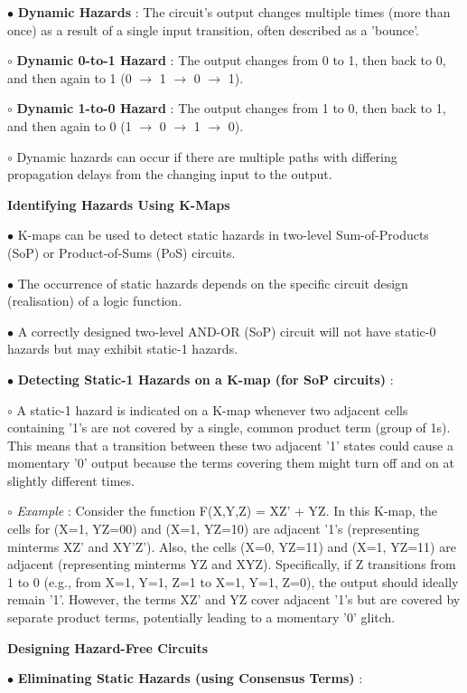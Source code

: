 \documentclass{article}
\begin{document}
\begin{itemize}
$\bullet$ \textbf{Dynamic Hazards} : The circuit's output changes multiple times (more than once) as a result of a single input transition, often described as a 'bounce'.

    $\circ$ \textbf{Dynamic 0-to-1 Hazard} : The output changes from 0 to 1, then back to 0, and then again to 1 (0 $\rightarrow$ 1 $\rightarrow$ 0 $\rightarrow$ 1).

    $\circ$ \textbf{Dynamic 1-to-0 Hazard} : The output changes from 1 to 0, then back to 1, and then again to 0 (1 $\rightarrow$ 0 $\rightarrow$ 1 $\rightarrow$ 0).

    $\circ$ Dynamic hazards can occur if there are multiple paths with differing propagation delays from the changing input to the output.

\textbf{Identifying Hazards Using K-Maps}

$\bullet$ K-maps can be used to detect static hazards in two-level Sum-of-Products (SoP) or Product-of-Sums (PoS) circuits.

$\bullet$ The occurrence of static hazards depends on the specific circuit design (realisation) of a logic function.

$\bullet$ A correctly designed two-level AND-OR (SoP) circuit will not have static-0 hazards but may exhibit static-1 hazards.

$\bullet$ \textbf{Detecting Static-1 Hazards on a K-map (for SoP circuits)} :

    $\circ$ A static-1 hazard is indicated on a K-map whenever two adjacent cells containing '1's are not covered by a single, common product term (group of 1s). This means that a transition between these two adjacent '1' states could cause a momentary '0' output because the terms covering them might turn off and on at slightly different times.

    $\circ$ \textit{Example} : Consider the function F(X,Y,Z) = XZ' + YZ.  In this K-map, the cells for (X=1, YZ=00) and (X=1, YZ=10) are adjacent '1's (representing minterms XZ' and XY'Z'). Also, the cells (X=0, YZ=11) and (X=1, YZ=11) are adjacent (representing minterms YZ and XYZ). Specifically, if Z transitions from 1 to 0 (e.g., from X=1, Y=1, Z=1 to X=1, Y=1, Z=0), the output should ideally remain '1'. However, the terms XZ' and YZ cover adjacent '1's but are covered by separate product terms, potentially leading to a momentary '0' glitch.

\textbf{Designing Hazard-Free Circuits}

$\bullet$ \textbf{Eliminating Static Hazards (using Consensus Terms)} :


\end{itemize}
\end{document}
